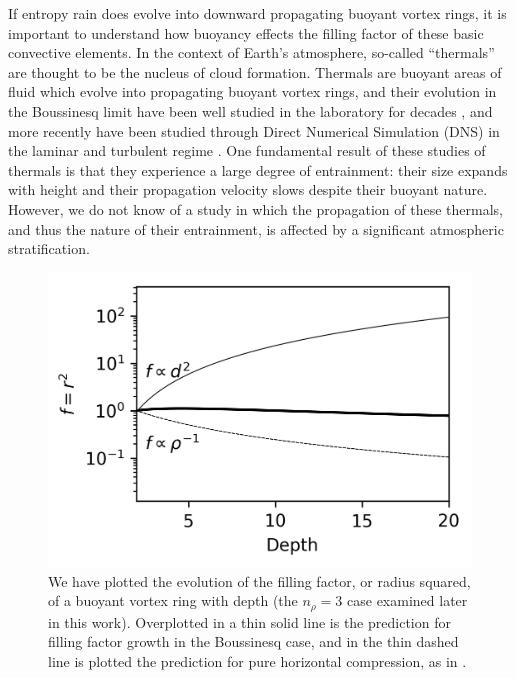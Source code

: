 \documentclass[twocolumn, amsmath, amsfonts, amssymb, trackchanges]{aastex62}
\begin{document}
If entropy rain does evolve into downward propagating buoyant vortex rings, it is important to understand how buoyancy effects the filling factor of these basic convective elements. 
In the context of Earth's atmosphere, so-called ``thermals'' are thought to be the nucleus of cloud formation. 
Thermals are buoyant areas of fluid which evolve into propagating buoyant vortex rings, and their evolution in the Boussinesq limit have been well studied in the laboratory for decades \citep[see e.g.][]{morton&all1956, scorer1957}, and more recently have been studied through Direct Numerical Simulation (DNS) in the laminar and turbulent regime \citep{lecoanet&jeevanjee2018}. 
One fundamental result of these studies of thermals is that they experience a large degree of entrainment: their size expands with height and their propagation velocity slows despite their buoyant nature.
However, we do not know of a study in which the propagation of these thermals, and thus the nature of their entrainment, is affected by a significant atmospheric stratification.

\begin{figure}[t!]
    \includegraphics[width=\columnwidth]{overview_fig.png}
    \caption{
	We have plotted the evolution of the filling factor, or radius squared, of a buoyant vortex ring with depth (the $n_\rho = 3$ case examined later in this work). 
	Overplotted in a thin solid line is the prediction for filling factor growth in the Boussinesq case, and in the thin dashed line is plotted the prediction for pure horizontal compression, as in \citet{brandenburg2016}.
    \label{fig:overview} }
\end{figure}
\end{document}
